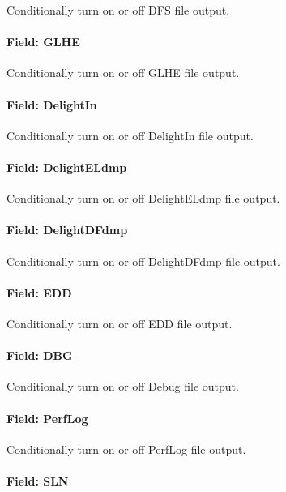 Conditionally turn on or off DFS file output.

\paragraph{Field: GLHE}\label{field-glhe}

Conditionally turn on or off GLHE file output.

\paragraph{Field: DelightIn}\label{field-delight-in}

Conditionally turn on or off DelightIn file output.

\paragraph{Field: DelightELdmp}\label{field-delight-el-dmp}

Conditionally turn on or off DelightELdmp file output.

\paragraph{Field: DelightDFdmp}\label{field-delight-df-dmp}

Conditionally turn on or off DelightDFdmp file output.

\paragraph{Field: EDD}\label{field-edd}

Conditionally turn on or off EDD file output.

\paragraph{Field: DBG}\label{field-dbg}

Conditionally turn on or off Debug file output.

\paragraph{Field: PerfLog}\label{field-perf-log}

Conditionally turn on or off PerfLog file output.

\paragraph{Field: SLN}\label{field-sln}

